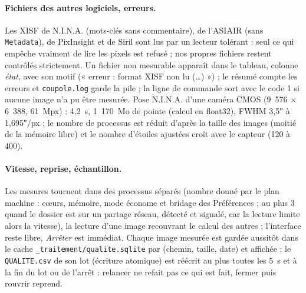 \paragraph{Fichiers des autres logiciels, erreurs.} Les XISF de N.I.N.A. (mots-clés sans commentaire), de l'ASIAIR
(sans \texttt{Metadata}), de PixInsight et de Siril sont lus par un lecteur tolérant : seul ce qui empêche
vraiment de lire les pixels est refusé ; nos propres fichiers restent contrôlés strictement. Un fichier non mesurable
apparaît dans le tableau, colonne \emph{état}, avec son motif (« erreur : format XISF non lu (…) ») ; le résumé
compte les erreurs et \texttt{coupole.log} garde la pile ; la ligne de commande sort avec le code 1 si aucune image
n'a pu être mesurée. Pose N.I.N.A. d'une caméra CMOS (9~576 × 6~388, 61~Mpx) : 4,2~s, 1~170~Mo de pointe (calcul en
float32), FWHM 3,5″ à 1,695″/px ; le nombre de processus est réduit d'après la taille des images (moitié de la
mémoire libre) et le nombre d'étoiles ajustées croît avec le capteur (120 à 400).

\paragraph{Vitesse, reprise, échantillon.} Les mesures tournent dans des processus séparés (nombre donné par le plan
machine : cœurs, mémoire, mode économe et bridage des Préférences ; au plus 3 quand le dossier est sur un partage
réseau, détecté et signalé, car la lecture limite alors la vitesse), la lecture d'une image recouvrant le calcul des
autres ; l'interface reste libre, \emph{Arrêter} est immédiat. Chaque image mesurée est gardée aussitôt dans le
cache \texttt{\_traitement/qualite.sqlite} par (chemin, taille, date) et affichée ; le \texttt{QUALITE.csv} de son
lot (écriture atomique) est réécrit au plus toutes les 5~s et à la fin du lot ou de l'arrêt : relancer ne refait pas
ce qui est fait, fermer puis rouvrir reprend.

